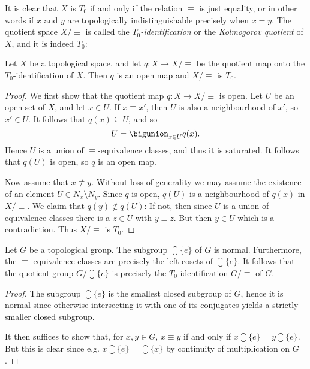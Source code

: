 \documentclass[article, a4paper, 11pt, oneside]{memoir}
\numberwithin{equation}{chapter}
\begin{document}
It is clear that $X$ is $T_0$ if and only if the relation $\equiv$ is just equality, or in other words if $x$ and $y$ are topologically indistinguishable precisely when $x = y$. The quotient space $X/{\equiv}$ is called the \emph{$T_0$-identification} or the \emph{Kolmogorov quotient} of $X$, and it is indeed $T_0$:

\begin{lemma}[$T_0$-identification]
    Let $X$ be a topological space, and let $q \colon X \to X/{\equiv}$ be the quotient map onto the $T_0$-identification of $X$. Then $q$ is an open map and $X/{\equiv}$ is $T_0$.
\end{lemma}

\begin{proof}
    We first show that the quotient map $q \colon X \to X/{\equiv}$ is open. Let $U$ be an open set of $X$, and let $x \in U$. If $x \equiv x'$, then $U$ is also a neighbourhood of $x'$, so $x' \in U$. It follows that $q(x) \subseteq U$, and so
    \begin{equation*}
        U = \bigunion_{x \in U} q(x).
    \end{equation*}
    Hence $U$ is a union of $\equiv$-equivalence classes, and thus it is saturated. It follows that $q(U)$ is open, so $q$ is an open map.

    Now assume that $x \not\equiv y$. Without loss of generality we may assume the existence of an element $U \in N_x \setminus N_y$. Since $q$ is open, $q(U)$ is a neighbourhood of $q(x)$ in $X/{\equiv}$. We claim that $q(y) \not\in q(U)$: If not, then since $U$ is a union of equivalence classes there is a $z \in U$ with $y \equiv z$. But then $y \in U$ which is a contradiction. Thus $X/{\equiv}$ is $T_0$.
\end{proof}


\begin{proposition}
    Let $G$ be a topological group. The subgroup $\closure{\{e\}}$ of $G$ is normal. Furthermore, the $\equiv$-equivalence classes are precisely the left cosets of $\closure{\{e\}}$. It follows that the quotient group $G / \closure{\{e\}}$ is precisely the $T_0$-identification $G/{\equiv}$ of $G$.
\end{proposition}

\begin{proof}
    The subgroup $\closure{\{e\}}$ is the smallest closed subgroup of $G$, hence it is normal since otherwise intersecting it with one of its conjugates yields a strictly smaller closed subgroup.

    It then suffices to show that, for $x,y \in G$, $x \equiv y$ if and only if $x \closure{\{e\}} = y \closure{\{e\}}$. But this is clear since e.g. $x \closure{\{e\}} = \closure{\{x\}}$ by continuity of multiplication on $G$.
\end{proof}
\end{document}
